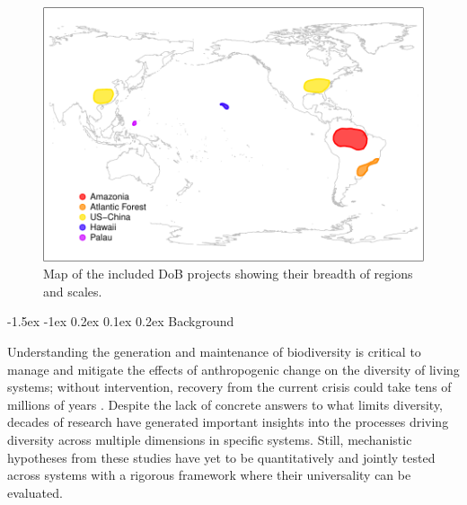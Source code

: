 \documentclass[11pt]{article}
\makeatletter
\renewcommand\subsection{\@startsection{subsection}{1}{\z@}%
                                  {-1.5ex \@plus -1ex \@minus 0.2ex}%
                                  {0.1ex \@plus 0.2ex}%
                                  {\normalfont\large\bfseries}}
\makeatother
\begin{document}
\begin{figure}
  \label{fig:map} 
  \vspace{-10pt}
  \begin{center}
    \includegraphics[width=1\textwidth]{../fig_map.pdf}
  \end{center}
  \vspace{-10pt}
  \caption{Map of the included DoB projects showing their breadth of
regions and scales.}
  \vspace{-10pt}
\end{figure}


\subsection{Background}\label{background}

Understanding the generation and maintenance of biodiversity is critical
to manage and mitigate the effects of anthropogenic change on the
diversity of living systems; without intervention, recovery from the
current crisis \cite{Barnosky2011-ww} could take tens of millions of
years \cite{Erwin2015-yb}. Despite the lack of concrete answers to what
limits diversity, decades of research have generated important insights
into the processes driving diversity across multiple dimensions in
specific systems. Still, mechanistic hypotheses from these studies have
yet to be quantitatively and jointly tested across systems with a
rigorous framework where their universality can be evaluated.
\end{document}
